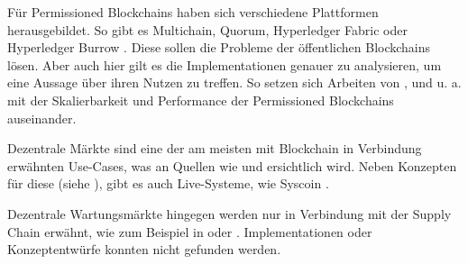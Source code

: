Für Permissioned Blockchains haben sich verschiedene Plattformen herausgebildet. So gibt es Multichain, Quorum, Hyperledger Fabric oder Hyperledger Burrow \cite{BenHamidaBlockchainEnterpriseOverview2017}. Diese sollen die Probleme der öffentlichen Blockchains lösen. Aber auch hier gilt es die Implementationen genauer zu analysieren, um eine Aussage über ihren Nutzen zu treffen. So setzen sich Arbeiten von \cite{BenHamidaBlockchainEnterpriseOverview2017}\cite{LiScalablePrivateIndustrial2017}, \cite{PongnumkulPerformanceAnalysisPrivate2017} und \cite{VukolicRethinkingPermissionedBlockchains2017} u. a. mit der Skalierbarkeit und Performance der Permissioned Blockchains auseinander.

Dezentrale Märkte sind eine der am meisten mit Blockchain in Verbindung erwähnten Use-Cases, was an Quellen wie \cite{BenHamidaBlockchainEnterpriseOverview2017} und \cite{RavalDecentralizedApplicationsHarnessing2016} ersichtlich wird.
Neben Konzepten für diese (siehe \cite{KaiserDecentralizedPrivateMarketplace2017}), gibt es auch Live-Systeme, wie Syscoin \cite{SidhuSyscoinPeertoPeerElectronic2017}.

Dezentrale Wartungsmärkte hingegen werden nur in Verbindung mit der Supply Chain erwähnt, wie zum Beispiel in \cite{SoldatosWhatDoesBlockchain2017} oder \cite{GotzeLufthansaIndustrySolutions}. Implementationen oder Konzeptentwürfe konnten nicht gefunden werden.